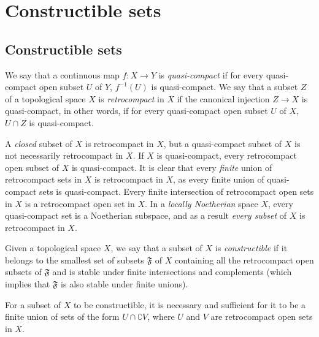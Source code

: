 \section{Constructible sets}
\label{section:0.9}

\subsection{Constructible sets}
\label{subsection:0.9.1}

\begin{definition}[9.1.1]
\label{0.9.1.1}
We say that a continuous map $f:X\to Y$ is \emph{quasi-compact} if for every quasi-compact open subset $U$ of $Y$, $f^{-1}(U)$ is quasi-compact.
We say that a subset $Z$ of a topological space $X$ is \emph{retrocompact} in $X$ if the canonical injection $Z\to X$ is quasi-compact, in other words, if for every quasi-compact open subset $U$ of $X$, $U\cap Z$ is quasi-compact.
\end{definition}

A \emph{closed} subset of $X$ is retrocompact in $X$, but a quasi-compact subset of $X$ is not necessarily retrocompact in $X$.
If $X$ is quasi-compact, every retrocompact open subset of $X$ is quasi-compact.
It is clear that every \emph{finite} union of retrocompact sets in $X$ is retrocompact in $X$, as every finite union of quasi-compact sets is quasi-compact.
Every finite intersection of retrocompact open sets in $X$ is a retrocompact open set in $X$.
In a \emph{locally Noetherian} space $X$, every quasi-compact set is a Noetherian subspace, and as a result \emph{every subset} of $X$ is retrocompact in $X$.

\begin{definition}[9.1.2]
\label{0.9.1.2}
Given a topological space $X$, we say that a subset of $X$ is \emph{constructible} if it belongs to the smallest set of subsets $\mathfrak{F}$ of $X$ containing all the retrocompact open subsets of $\mathfrak{F}$ and is stable under finite intersections and complements (which implies that $\mathfrak{F}$ is also stable under finite unions).
\end{definition}

\begin{proposition}[9.1.3]
\label{0.9.1.3}
For a subset of $X$ to be constructible, it is necessary and sufficient for it to be a finite union of sets of the form $U\cap\complement{V}$, where $U$ and $V$ are retrocompact open sets in $X$.
\end{proposition}

